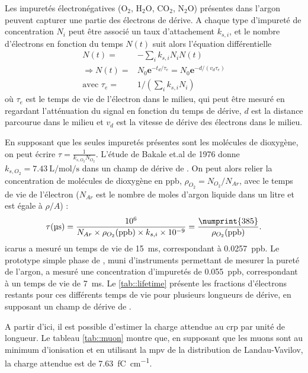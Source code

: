         Les impuretés électronégatives (O$_2$, H$_2$O, CO$_2$, N$_2$O) présentes dans l'argon peuvent capturer une partie des électrons de dérive. A chaque type d'impureté de concentration $N_i$ peut être associé un taux d'attachement $k_{s,i}$, et le nombre d'électrons en fonction du temps $N(t)$ suit alors l'équation différentielle\cite{Buckley1989}
        \begin{eqnarray}
          N(t) = & -\sum_{i} k_{s,i}N_i N(t)\\
          \Rightarrow N(t) = & N_0\textbf{e}^{-t_d/\tau_e}=N_0\textbf{e}^{-d/(v_d\tau_e)}\label{eq::losses} \\
          \text{avec } \tau_e = & 1/(\sum_{i} k_{s,i}N_i)
        \end{eqnarray}
        où $\tau_e$ est le temps de vie de l'électron dans le milieu, qui peut être mesuré en regardant l'atténuation du signal en fonction du temps de dérive, $d$ est la distance parcourue dans le milieu et $v_d$ est la vitesse de dérive des électrons dans le milieu.

        En supposant que les seules impuretés présentes sont les molécules de dioxygène, on peut écrire $\tau = \frac{1}{k_{s,O_2} N_{O_2}}$. L'étude de Bakale et.al de 1976\cite{Bakale1976} donne $k_{s,O_2}=\SI{7.43}{\liter\per\mole\per\second}$ dans un champ de dérive de \driftfield{}. On peut alors relier la concentration de molécules de dioxygène en ppb, $\rho_{O_2}=N_{O_2}/N_{Ar}$, avec le temps de vie de l'électron ($N_{Ar}$ est le nombre de moles d'argon liquide dans un litre et est égale à $\rho/A$) : 
        \begin{equation}
          \tau(\si{\micro\second}) = \frac{10^6}{N_{Ar}\times \rho_{O_2}(\si{ppb}) \times k_{s,i} \times 10^{-9}} = \frac{\numprint{385}}{\rho_{O_2}(\si{ppb})}\label{eq::purity}.
        \end{equation}
        \gls{icarus} a mesuré un temps de vie de \SI{15}{\milli\second}\cite{Antonello2014}, correspondant à \SI{0.0257}{ppb}. Le prototype simple phase de \protosp{}, muni d'instruments permettant de mesurer la pureté de l'argon, a mesuré une concentration d'impuretés de \SI{0.055}{ppb}, correspondant à un temps de vie de \SI{7}{\milli\second}. Le \autoref{tab::lifetime} présente les fractions d'électrons restants pour ces différents temps de vie pour plusieurs longueurs de dérive, en supposant un champ de dérive de \driftfield{}.

        A partir d'ici, il est possible d'estimer la charge attendue au \gls{crp} par unité de longueur. Le tableau \autoref{tab::muon} montre que, en supposant que les muons sont au minimum d'ionisation et en utilisant la \gls{mpv} de la distribution de Landau-Vavilov, la charge attendue est de \SI{7.63}{\femto\coulomb\per\centi\meter}.

